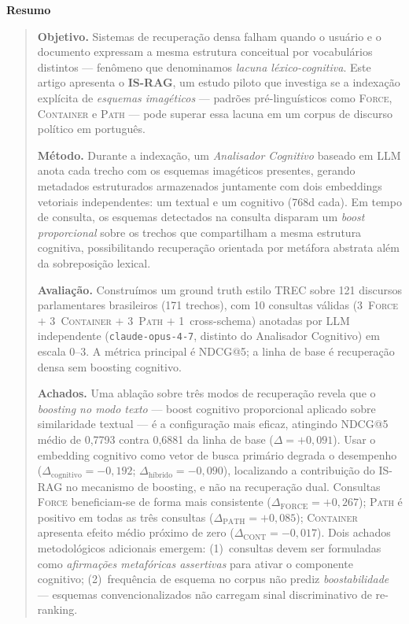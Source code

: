 \documentclass[11pt,a4paper]{article}
\renewenvironment{abstract}{%
  \small\begin{center}{\bfseries Resumo}\end{center}%
  \begin{quote}\small
}{%
  \end{quote}\bigskip
}
\begin{document}
\begin{abstract}
\textbf{Objetivo.}
Sistemas de recuperação densa falham quando o usuário e o documento
expressam a mesma estrutura conceitual por vocabulários distintos —
fenômeno que denominamos \emph{lacuna léxico-cognitiva}.
Este artigo apresenta o \textbf{IS-RAG}, um estudo piloto que investiga
se a indexação explícita de \emph{esquemas imagéticos}
\citep{lakoff1980,talmy1988} — padrões pré-linguísticos como
\textsc{Force}, \textsc{Container} e \textsc{Path} — pode superar essa
lacuna em um corpus de discurso político em português.

\textbf{Método.}
Durante a indexação, um \emph{Analisador Cognitivo} baseado em LLM
anota cada trecho com os esquemas imagéticos presentes, gerando
metadados estruturados armazenados juntamente com dois embeddings
vetoriais independentes: um textual e um cognitivo (768d cada).
Em tempo de consulta, os esquemas detectados na consulta disparam um
\emph{boost proporcional} sobre os trechos que compartilham a mesma
estrutura cognitiva, possibilitando recuperação orientada por metáfora
abstrata além da sobreposição lexical.

\textbf{Avaliação.}
Construímos um ground truth estilo TREC sobre 121 discursos
parlamentares brasileiros (171 trechos), com 10 consultas válidas
(3~\textsc{Force} $+$ 3~\textsc{Container} $+$ 3~\textsc{Path} $+$
1~cross-schema) anotadas por LLM independente (\texttt{claude-opus-4-7},
distinto do Analisador Cognitivo) em escala 0--3.
A métrica principal é NDCG@5; a linha de base é recuperação densa sem
boosting cognitivo.

\textbf{Achados.}
Uma ablação sobre três modos de recuperação revela que o
\emph{boosting no modo texto} — boost cognitivo proporcional aplicado
sobre similaridade textual — é a configuração mais eficaz, atingindo
NDCG@5 médio de 0,7793 contra 0,6881 da linha de base
($\Delta = +0{,}091$).
Usar o embedding cognitivo como vetor de busca primário degrada o
desempenho ($\Delta_\text{cognitivo} = -0{,}192$;
$\Delta_\text{híbrido} = -0{,}090$), localizando a contribuição do
IS-RAG no mecanismo de boosting, e não na recuperação dual.
Consultas \textsc{Force} beneficiam-se de forma mais consistente
($\Delta_\text{FORCE} = +0{,}267$); \textsc{Path} é positivo em todas
as três consultas ($\Delta_\text{PATH} = +0{,}085$);
\textsc{Container} apresenta efeito médio próximo de zero
($\Delta_\text{CONT} = -0{,}017$).
Dois achados metodológicos adicionais emergem: (1)~consultas devem ser
formuladas como \emph{afirmações metafóricas assertivas} para ativar o
componente cognitivo; (2)~frequência de esquema no corpus não prediz
\emph{boostabilidade} — esquemas convencionalizados não carregam sinal
discriminativo de re-ranking.
\end{abstract}
\end{document}

